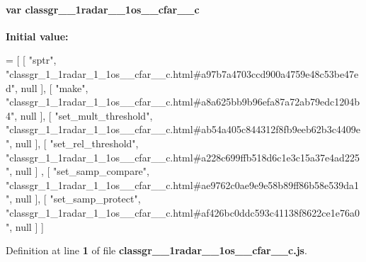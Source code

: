 \paragraph[{classgr\+\_\+1\+\_\+1radar\+\_\+1\+\_\+1os\+\_\+\+\_\+cfar\+\_\+\+\_\+c}]{\setlength{\rightskip}{0pt plus 5cm}var classgr\+\_\+\_\+1radar\+\_\+\_\+1os\+\_\+\+\_\+cfar\+\_\+\+\_\+c}\label{classgr__1__1radar__1__1os____cfar____c_8js_a19fb2cb1269f267b5405371daac234b8}
{\bfseries Initial value\+:}
\begin{DoxyCode}
=
[
    [ \textcolor{stringliteral}{"sptr"}, \textcolor{stringliteral}{"classgr\_1\_1radar\_1\_1os\_\_cfar\_\_c.html#a97b7a4703ccd900a4759e48c53be47ed"}, null ],
    [ \textcolor{stringliteral}{"make"}, \textcolor{stringliteral}{"classgr\_1\_1radar\_1\_1os\_\_cfar\_\_c.html#a8a625bb9b96efa87a72ab79edc1204b4"}, null ],
    [ \textcolor{stringliteral}{"set\_mult\_threshold"}, \textcolor{stringliteral}{"classgr\_1\_1radar\_1\_1os\_\_cfar\_\_c.html#ab54a405c844312f8fb9eeb62b3c4409e"}, null 
      ],
    [ \textcolor{stringliteral}{"set\_rel\_threshold"}, \textcolor{stringliteral}{"classgr\_1\_1radar\_1\_1os\_\_cfar\_\_c.html#a228c699ffb518d6c1e3c15a37e4ad225"}, null ]
      ,
    [ \textcolor{stringliteral}{"set\_samp\_compare"}, \textcolor{stringliteral}{"classgr\_1\_1radar\_1\_1os\_\_cfar\_\_c.html#ae9762c0ae9e9e58b89ff86b58e539da1"}, null ],
    [ \textcolor{stringliteral}{"set\_samp\_protect"}, \textcolor{stringliteral}{"classgr\_1\_1radar\_1\_1os\_\_cfar\_\_c.html#af426bc0ddc593c41138f8622ce1e76a0"}, null ]
]
\end{DoxyCode}


Definition at line {\bf 1} of file {\bf classgr\+\_\+\_\+1radar\+\_\+\_\+1os\+\_\+\+\_\+cfar\+\_\+\+\_\+c.\+js}.

